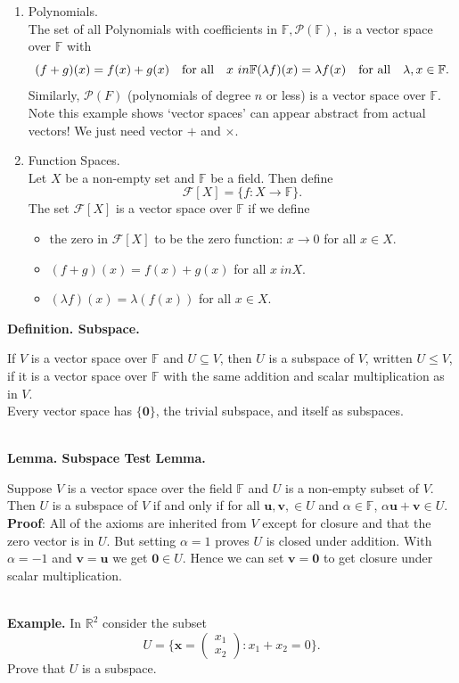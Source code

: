 \documentclass{article}
\newcommand{\vect}[1]{\mathbf{#1}}
\newcommand{\definition}[2]{\textbf{Definition. #1.}\begin{adjustwidth}{1cm}{1cm}#2\end{adjustwidth}}
\newcommand{\lemma}[2]{\textbf{Lemma. #1.}\begin{adjustwidth}{1cm}{1cm}#2\end{adjustwidth}}
\begin{document}
\begin{enumerate}
  \item Polynomials.\\The set of all Polynomials with coefficients in $\mathbb{F}, \mathcal{P}(\mathbb{F}),$ is a vector space over $\mathbb{F}$ with \[(f+g)(x) = f(x) + g(x) \quad \text{for all} \quad x \ in \mathbb{F} \\ (\lambda f)(x) = \lambda f(x) \quad \text{for all} \quad \lambda, x \in \mathbb{F}.\]Similarly, $\mathcal{P}(F)$ (polynomials of degree $n$ or less) is a vector space over $\mathbb{F}$. Note this example shows `vector spaces' can appear abstract from actual vectors! We just need vector $+$ and $\times$.
  \item Function Spaces.\\Let $X$ be a non-empty set and $\mathbb{F}$ be a field. Then define \[\mathcal{F}[X] = \{f: X \rightarrow \mathbb{F} \}.\]The set $\mathcal{F}[X]$ is a vector space over $\mathbb{F}$ if we define \begin{itemize}\item the zero in $\mathcal{F}[X]$ to be the zero function: $x \rightarrow 0$ for all $x \in X$.
  \item $(f+g)(x) = f(x) + g(x)$ for all $x \ in X$.
  \item $(\lambda f)(x) = \lambda (f(x))$ for all $x \in X$.
  \end{itemize}
\end{enumerate}\newpage
\definition{Subspace}{If $V$ is a vector space over $\mathbb{F}$ and $U \subseteq V$, then $U$ is a subspace of $V$, written $U \leq V$, if it is a vector space over $\mathbb{F}$ with the same addition and scalar multiplication as in $V$.\\[1\baselineskip]Every vector space has $\{\vect{0}\}$, the trivial subspace, and itself as subspaces.}~\\
\lemma{Subspace Test Lemma}{Suppose $V$ is a vector space over the field $\mathbb{F}$ and $U$ is a non-empty subset of $V$. Then $U$ is a subspace of $V$ if and only if for all $\vect{u}, \vect{v}, \in U$ and $\alpha \in \mathbb{F}$, $\alpha \vect{u} + \vect{v} \in U$.\\[1\baselineskip]\textbf{Proof}: All of the axioms are inherited from $V$ except for closure and that the zero vector is in $U$. But setting $\alpha = 1$ proves $U$ is closed under addition. With $\alpha = -1$ and $\vect{v} = \vect{u}$ we get $\vect{0} \in U$. Hence we can set $\vect{v} = \vect{0}$ to get closure under scalar multiplication.}~\\
\textbf{Example.} In $\mathbb{R}^2$ consider the subset \[U = \{ \vect{x} = \begin{pmatrix} x_1 \\ x_2 \end{pmatrix} : x_1 + x_2 = 0 \}.\] Prove that $U$ is a subspace.\\
\end{document}

